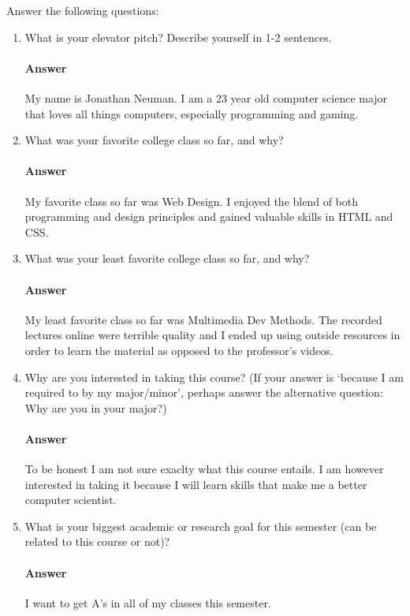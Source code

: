 \documentclass{article}
\begin{document}
Answer the following questions:
\begin{enumerate}
    \item What is your elevator pitch?  Describe yourself in 1-2
        sentences.
        \paragraph{Answer} My name is Jonathan Neuman. I am a 23 year old computer science major that loves all things computers, especially programming and gaming.

    \item What was your favorite college class so far, and why?
        \paragraph{Answer} My favorite class so far was Web Design. I enjoyed the blend of both programming and design principles and gained valuable skills in HTML and CSS.

    \item What was your least favorite college class so far, and why?
        \paragraph{Answer} My least favorite class so far was Multimedia Dev Methods. The recorded lectures online were terrible quality and I ended up using outside resources in order to learn the material as opposed to the professor's videos.

    \item Why are you interested in taking this course? (If your answer is
        `because I am required to by my major/minor', perhaps answer the
        alternative question: Why are you in your major?)
        \paragraph{Answer} To be honest I am not sure exaclty what this course entails. I am however interested in taking it because I will learn skills that make me a better computer scientist.

    \item What is your biggest academic or research goal for this semester (can
        be related to this course or not)?
        \paragraph{Answer} I want to get A's in all of my classes this semester.


\end{enumerate}
\end{document}
